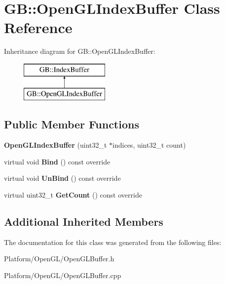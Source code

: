 \hypertarget{class_g_b_1_1_open_g_l_index_buffer}{}\section{GB\+::Open\+G\+L\+Index\+Buffer Class Reference}
\label{class_g_b_1_1_open_g_l_index_buffer}
Inheritance diagram for GB\+::Open\+G\+L\+Index\+Buffer\+:\begin{figure}[H]
\begin{center}
\leavevmode
\includegraphics[height=2.000000cm]{class_g_b_1_1_open_g_l_index_buffer}
\end{center}
\end{figure}
\subsection*{Public Member Functions}
\begin{DoxyCompactItemize}
\item 
\mbox{\label{class_g_b_1_1_open_g_l_index_buffer_adaa0afad83f3bbdd824ca6ecafe9ed25}} 
{\bfseries Open\+G\+L\+Index\+Buffer} (uint32\+\_\+t $\ast$indices, uint32\+\_\+t count)
\item 
\mbox{\label{class_g_b_1_1_open_g_l_index_buffer_a6a2a9471bc9a65ea41a62717ebb887ca}} 
virtual void {\bfseries Bind} () const override
\item 
\mbox{\label{class_g_b_1_1_open_g_l_index_buffer_a8cc9f4bc05ab4f09255d7f31e1e1c656}} 
virtual void {\bfseries Un\+Bind} () const override
\item 
\mbox{\label{class_g_b_1_1_open_g_l_index_buffer_a02b9eeca8e8b3fd81b773dfff58a49fb}} 
virtual uint32\+\_\+t {\bfseries Get\+Count} () const override
\end{DoxyCompactItemize}
\subsection*{Additional Inherited Members}


The documentation for this class was generated from the following files\+:\begin{DoxyCompactItemize}
\item 
Platform/\+Open\+G\+L/Open\+G\+L\+Buffer.\+h\item 
Platform/\+Open\+G\+L/Open\+G\+L\+Buffer.\+cpp\end{DoxyCompactItemize}
